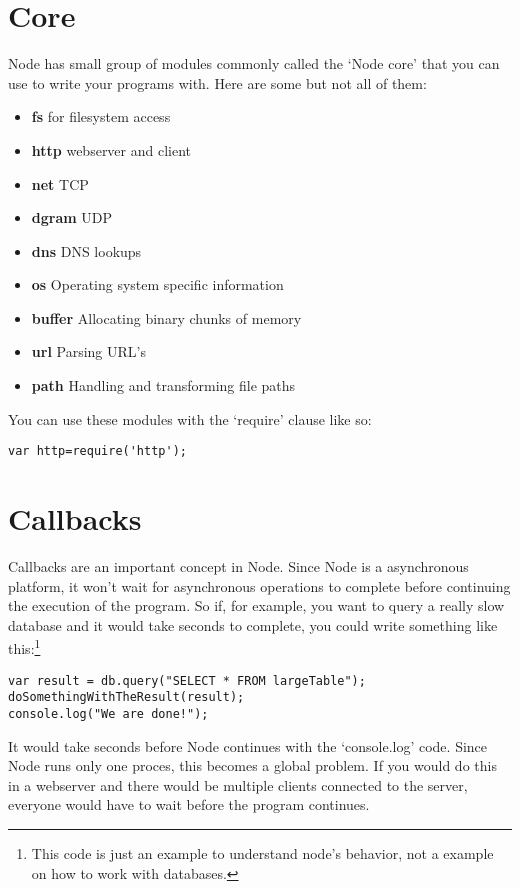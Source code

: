 \documentclass[a4paper]{report}
\begin{document}
\section*{Core}
Node has small group of modules commonly called the `Node core' that you can use to write your programs with. Here are some but not all of them:
\begin{itemize}
	\item \textbf{fs} for filesystem access
	\item \textbf{http} webserver and client
	\item \textbf{net} TCP 
	\item \textbf{dgram} UDP
	\item \textbf{dns} DNS lookups
	\item \textbf{os} Operating system specific information
	\item \textbf{buffer} Allocating binary chunks of memory
	\item \textbf{url} Parsing URL's
	\item \textbf{path} Handling and transforming file paths
\end{itemize}

\noindent You can use these modules with the `require' clause like so: 
\begin{lstlisting}
var http=require('http');
\end{lstlisting}

\section*{Callbacks}
Callbacks are an important concept in Node. Since Node is a asynchronous platform, it won't wait for asynchronous operations to complete before continuing the execution of the program. So if, for example, you want to query a really slow database and it would take seconds to complete, you could write something like this:\footnote{This code is just an example to understand node's behavior, not a example on how to work with databases.}
\begin{lstlisting}
var result = db.query("SELECT * FROM largeTable");
doSomethingWithTheResult(result);
console.log("We are done!");
\end{lstlisting}
\noindent It would take seconds before Node continues with the `console.log' code. Since Node runs only one proces, this becomes a global problem. If you would do this in a webserver and there would be multiple clients connected to the server, everyone would have to wait before the program continues. 
\end{document}
